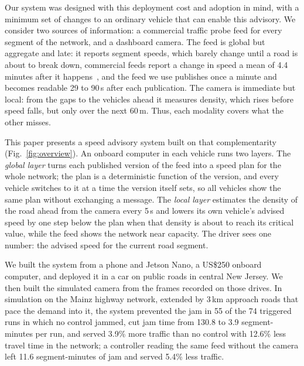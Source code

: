 Our system was designed with this deployment cost and adoption in mind, with a minimum set of changes to an ordinary vehicle that can enable this advisory. We consider two sources of information: a commercial traffic probe feed for every segment of the network, and a dashboard camera. The feed is global but aggregate and late: it reports segment speeds, which barely change until a road is about to break down, commercial feeds report a change in speed a mean of 4.4 minutes after it happens~\cite{wang2018latency}, and the feed we use publishes once a minute and becomes readable 29 to 90\,s after each publication. The camera is immediate but local: from the gaps to the vehicles ahead it measures density, which rises before speed falls, but only over the next 60\,m. Thus, each modality covers what the other misses.

This paper presents a speed advisory system built on that complementarity (Fig.~\ref{fig:overview}). An onboard computer in each vehicle runs two layers. The \emph{global layer} turns each published version of the feed into a speed plan for the whole network; the plan is a deterministic function of the version, and every vehicle switches to it at a time the version itself sets, so all vehicles show the same plan without exchanging a message. The \emph{local layer} estimates the density of the road ahead from the camera every 5\,s and lowers its own vehicle's advised speed by one step below the plan when that density is about to reach its critical value, while the feed shows the network near capacity. The driver sees one number: the advised speed for the current road segment.

We built the system from a phone and Jetson Nano, a US\$250 onboard computer, and deployed it in a car on public roads in central New Jersey. We then built the simulated camera from the frames recorded on those drives. In simulation on the Mainz highway network, extended by 3\,km approach roads that pace the demand into it, the system prevented the jam in 55 of the 74 triggered runs in which no control jammed, cut jam time from 130.8 to 3.9 segment-minutes per run, and served 3.9\% more traffic than no control with 12.6\% less travel time in the network; a controller reading the same feed without the camera left 11.6 segment-minutes of jam and served 5.4\% less traffic.

